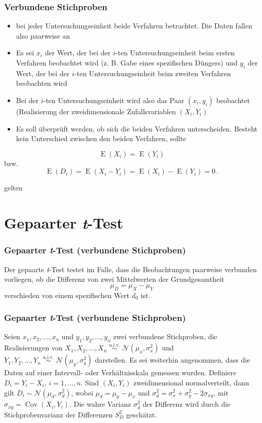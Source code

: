 \documentclass{beamer}
\begin{document}
\begin{frame}
\frametitle{Verbundene Stichproben}
\begin{itemize}
\item bei jeder Untersuchungseinheit beide Verfahren betrachtet. Die Daten fallen also paarweise an
\item Es sei $x_{i}$ der Wert, der bei der $i$-ten Untersuchungseinheit beim ersten Verfahren beobachtet wird (z. B. Gabe eines spezifischen Düngers) und $y_{i}$ der Wert, der bei der $i$-ten Untersuchungseinheit beim zweiten Verfahren beobachten wird
\item Bei der $i$-ten Untersuchungseinheit wird also das Paar $(x_{i},y_{i})$ beobachtet (Realisierung der zweidimensionale Zufallsvariablen $(X_{i},Y_{i})$
\item Es soll überprüft werden, ob sich die beiden Verfahren unterscheiden. Besteht kein Unterschied zwischen den beiden Verfahren, sollte
\end{itemize}
 \[\operatorname{E}(X_{i}) = \operatorname{E}(Y_{i})\] bzw.  \[\operatorname{E}(D_{i}) =  \operatorname{E}(X_{i} - Y_{i}) = \operatorname{E}(X_{i}) -\operatorname{E}(Y_{i}) = 0\,.\]
 
gelten

\end{frame}

\section{Gepaarter \textit{t}-Test}
\frame{\sectionpage}
\begin{frame}
\frametitle{Gepaarter \textit{t}-Test (verbundene Stichproben)}
Der gepaarte \textit{t}-Test testet im Falle, dass die Beobachtungen paarweise verbunden vorliegen, ob die Differenz von zwei Mittelwerten der Grundgesamtheit \[\mu_{D} = \mu_{X} - \mu_{Y}\] verschieden von einem spezifischen Wert $d_{0}$ ist.
\end{frame}

   
\begin{frame}
\frametitle{Gepaarter \textit{t}-Test (verbundene Stichproben)}

Seien $x_1, x_2, \dots, x_n$ und $y_1, y_2, \dots, y_n$ zwei verbundene Stichproben, die Realisierungen von $X_1, X_2, \dots, X_n  \; \stackrel{\mathrm{u.i.v.}}{\sim} \; \mathcal{N}(\mu_{x}, \sigma_{x}^2)$ und $Y_1, Y_2, \dots, Y_n  \; \stackrel{\mathrm{u.i.v.}}{\sim} \; \mathcal{N}(\mu_{y}, \sigma_{y}^2)$ darstellen. Es sei weiterhin angenommen, dass die Daten auf einer Intervall- oder Verhältnisskala gemessen wurden. Definiere $D_{i} = Y_{i} - X_{i}, \, i = 1, \ldots, n$. Sind $(X_i, Y_i)$ zweidimensional normalverteilt, dann gilt $D_{i} \sim \mathcal{N}(\mu_{d}, \sigma^2_{d})$, wobei $\mu_{d} = \mu_{y} - \mu_{x}$ und $\sigma_{d}^2 = \sigma_{x}^2 + \sigma_{y}^2 -2\sigma_{xy}$, mit $\sigma_{xy}  = \operatorname{Cov}(X_{i}, Y_{i})$. Die wahre Varianz $\sigma_{d}^2$ der Differenz wird durch die Stichprobenvarianz der Differenzen $S^2_{D}$ geschätzt.
\end{frame}
\end{document}
